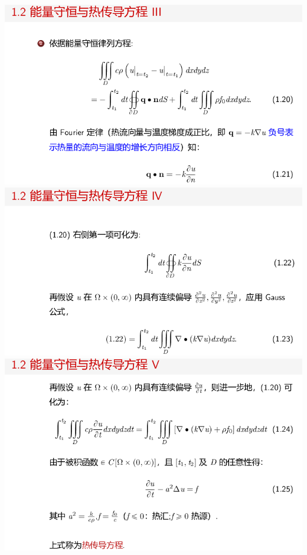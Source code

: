 \documentclass[11pt,a4paper]{ctexart}
\begin{document}
\begin{paracol}{2}
\includegraphics[width=\linewidth]{chap01_30.png}
\includegraphics[width=\linewidth]{chap01_31.png}
\includegraphics[width=\linewidth]{chap01_32.png}
\newpage


\end{paracol}
\end{document}
